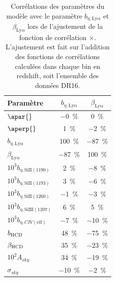 \begin{table}[]
  \centering
  \caption{Corrélations des paramètres du modèle avec le paramètre $b_{\eta,\mathrm{Ly}\alpha}$ et $\beta_{\mathrm{Ly}\alpha}$ lors de l'ajustement de la fonction de corrélation \lya{}$\times$\lya{}. L'ajustement est fait sur l'addition des fonctions de corrélations calculées dans chaque bin en redshift, soit l'ensemble des données DR16.}
  \label{tab:corr_bias_lya}
  \begin{tabular}{lcc}
    \toprule
    Paramètre  & $b_{\eta,\mathrm{Ly}\alpha}$ & $\beta_{\mathrm{Ly}\alpha}$ \\
    \midrule
    $\apar{} $ & \SI{-0}{\percent} & \SI{0}{\percent}\\
    $\aperp{} $ & \SI{1}{\percent} & \SI{-2}{\percent} \\
    $b_{\eta, \mathrm{Ly}\alpha} $ & \SI{100}{\percent} & \SI{-87}{\percent} \\
    $\beta_{\mathrm{Ly}\alpha} $ & \SI{-87}{\percent} &  \SI{100}{\percent} \\
    $10^3 b_{\eta, \mathrm{SiII}(1190)} $ & \SI{2}{\percent} & \SI{-8}{\percent} \\
    $10^3 b_{\eta, \mathrm{SiII}(1193)} $ & \SI{3}{\percent} & \SI{-6}{\percent} \\
    $10^3 b_{\eta, \mathrm{SiII}(1260)} $ & \SI{-1}{\percent} & \SI{-3}{\percent} \\
    $10^3 b_{\eta, \mathrm{SiIII}(1207)} $ & \SI{6}{\percent} & \SI{5}{\percent}\\
    $10^3 b_{\eta, CIV(\mathrm{eff})} $ &\SI{-7}{\percent} & \SI{-10}{\percent}\\
    $b_{\textsc{HCD}} $ & \SI{48}{\percent} & \SI{-75}{\percent}\\
    $\beta_{\textsc{HCD}} $ & \SI{35}{\percent} & \SI{-23}{\percent}\\
    $10^2 A_{sky} $ & \SI{34}{\percent} & \SI{-19}{\percent}\\
    $\sigma_{sky} $ & \SI{-10}{\percent} & \SI{-2}{\percent}\\
    \bottomrule
\end{tabular}
\end{table}

